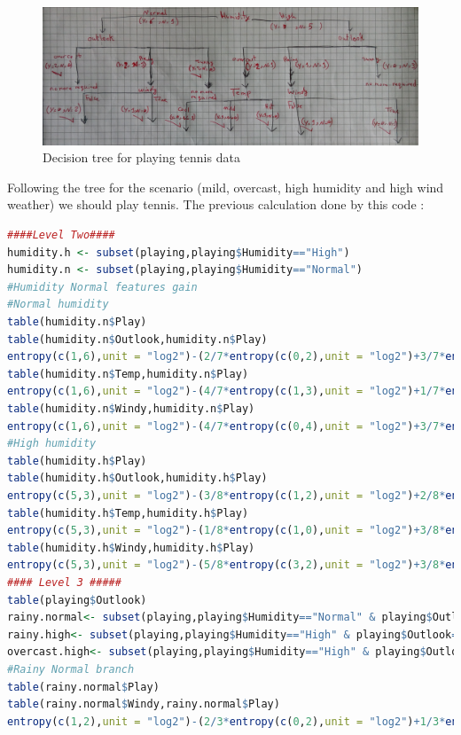 \documentclass{article}
\begin{document}
\begin{figure}[H]
	\includegraphics[scale =0.14]{tablecropped.jpg}
	\caption{Decision tree for playing tennis data}
\end{figure}
Following the tree for the scenario (mild, overcast, high humidity and high wind weather) we should play tennis.
The previous calculation done by this code :
\begin{lstlisting}[language=R]
####Level Two####
humidity.h <- subset(playing,playing$Humidity=="High")
humidity.n <- subset(playing,playing$Humidity=="Normal")
#Humidity Normal features gain
#Normal humidity
table(humidity.n$Play)
table(humidity.n$Outlook,humidity.n$Play)
entropy(c(1,6),unit = "log2")-(2/7*entropy(c(0,2),unit = "log2")+3/7*entropy(c(1,2),unit = "log2")+2/7*entropy(c(0,2),unit = "log2"))
table(humidity.n$Temp,humidity.n$Play)
entropy(c(1,6),unit = "log2")-(4/7*entropy(c(1,3),unit = "log2")+1/7*entropy(c(0,1),unit = "log2")+2/7*entropy(c(0,2),unit = "log2"))
table(humidity.n$Windy,humidity.n$Play)
entropy(c(1,6),unit = "log2")-(4/7*entropy(c(0,4),unit = "log2")+3/7*entropy(c(1,2),unit = "log2"))
#High humidity
table(humidity.h$Play)
table(humidity.h$Outlook,humidity.h$Play)
entropy(c(5,3),unit = "log2")-(3/8*entropy(c(1,2),unit = "log2")+2/8*entropy(c(1,1),unit = "log2")+3/8*entropy(c(3,0),unit = "log2"))
table(humidity.h$Temp,humidity.h$Play)
entropy(c(5,3),unit = "log2")-(1/8*entropy(c(1,0),unit = "log2")+3/8*entropy(c(2,1),unit = "log2")+4/8*entropy(c(2,2),unit = "log2"))
table(humidity.h$Windy,humidity.h$Play)
entropy(c(5,3),unit = "log2")-(5/8*entropy(c(3,2),unit = "log2")+3/8*entropy(c(2,1),unit = "log2"))
#### Level 3 #####
table(playing$Outlook)
rainy.normal<- subset(playing,playing$Humidity=="Normal" & playing$Outlook=="Rainy")
rainy.high<- subset(playing,playing$Humidity=="High" & playing$Outlook=="Rainy")
overcast.high<- subset(playing,playing$Humidity=="High" & playing$Outlook=="Overcast")
#Rainy Normal branch
table(rainy.normal$Play)
table(rainy.normal$Windy,rainy.normal$Play)
entropy(c(1,2),unit = "log2")-(2/3*entropy(c(0,2),unit = "log2")+1/3*entropy(c(1,0),unit = "log2"))

\end{lstlisting}
\end{document}
